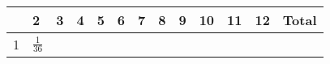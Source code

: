 \documentclass[]{book}
\numberwithin{equation}{chapter}
\numberwithin{figure}{chapter}
\theoremstyle{plain}
\theoremstyle{definition}
\theoremstyle{remark}
\theoremstyle{definition}
\theoremstyle{definition}
\theoremstyle{remark}
\begin{document}
\begin{longtable}[]{@{}lllllllllllll@{}}
\begin{minipage}[b]{0.02\columnwidth}
\strut
\end{minipage} & \begin{minipage}[b]{0.05\columnwidth}\raggedright\strut
2\strut
\end{minipage} & \begin{minipage}[b]{0.05\columnwidth}\raggedright\strut
3\strut
\end{minipage} & \begin{minipage}[b]{0.05\columnwidth}\raggedright\strut
4\strut
\end{minipage} & \begin{minipage}[b]{0.05\columnwidth}\raggedright\strut
5\strut
\end{minipage} & \begin{minipage}[b]{0.05\columnwidth}\raggedright\strut
6\strut
\end{minipage} & \begin{minipage}[b]{0.05\columnwidth}\raggedright\strut
7\strut
\end{minipage} & \begin{minipage}[b]{0.05\columnwidth}\raggedright\strut
8\strut
\end{minipage} & \begin{minipage}[b]{0.05\columnwidth}\raggedright\strut
9\strut
\end{minipage} & \begin{minipage}[b]{0.05\columnwidth}\raggedright\strut
10\strut
\end{minipage} & \begin{minipage}[b]{0.05\columnwidth}\raggedright\strut
11\strut
\end{minipage} & \begin{minipage}[b]{0.05\columnwidth}\raggedright\strut
12\strut
\end{minipage} & \begin{minipage}[b]{0.05\columnwidth}\raggedright\strut
Total\strut
\end{minipage}\tabularnewline
\midrule
\endhead
\begin{minipage}[t]{0.02\columnwidth}\raggedright\strut
1\strut
\end{minipage} & \begin{minipage}[t]{0.05\columnwidth}\raggedright\strut
\(\frac{1}{36}\)\strut
\end{minipage} & \begin{minipage}[t]{0.05\columnwidth}\raggedright\strut
\strut
\end{minipage} & \begin{minipage}[t]{0.05\columnwidth}\raggedright\strut

\end{minipage}
\end{longtable}
\end{document}
